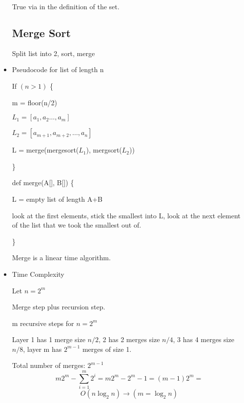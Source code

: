 \documentclass{report}
\begin{document}
\begin{itemize}
True via in the definition of the set.

\subsection{Merge Sort}
Split list into 2, sort, merge

\item
Pseudocode for list of length n

If $(n > 1)$ \{

m = floor(n/2)

$L_1 = [a_1, a_2 \ldots, a_m]$

$L_2 = [a_{m+1}, a_{m+2}, \ldots, a_n]$

L = merge(mergesort($L_1$), mergsort($L_2$))

\}

def merge(A[], B[]) \{

L = empty list of length A+B

look at the first elements, stick the smallest into L, look at the next element of the list that we took the smallest out of.

\}

Merge is a linear time algorithm.

\item
Time Complexity

Let $n = 2^m$

Merge step plus recursion step.

m recursive steps for $n = 2^m$

Layer 1 has 1 merge size $n/2$, 2 has 2 merges size $n/4$, 3 has 4 merges size $n/8$, layer m has $2^{m-1}$ merges of size 1.

Total number of merges: $2^{m-1}$
\[
m2^m - \sum^m_{i=1}2^i = m2^m - 2^m - 1 = (m-1)2^m =
\]
\[
 O(n\log_2 n) \rightarrow (m = \log_2 n)
\]


\end{itemize}
\end{document}
